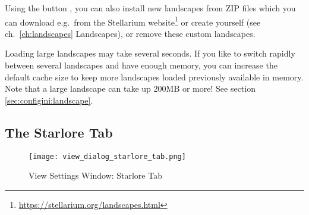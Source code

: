 \noindent Using the button , you can also
install new landscapes from ZIP files which you can download e.g.\
from the Stellarium
website\footnote{\url{https://stellarium.org/landscapes.html}}
or create yourself (see ch.~\ref{ch:landscapes} Landscapes), or remove
these custom landscapes.

Loading large landscapes may take several seconds. 
If you like to switch rapidly between several landscapes and have enough memory, 
you can increase the default cache size to keep more landscapes loaded previously 
available in memory. Note that a large landscape can take up 200MB or more! 
See section \ref{sec:configini:landscape}.

\subsection{The Starlore Tab}
\label{sec:gui:view:starlore}

\begin{figure}[htbp]
\centering\texttt{[image: view\_dialog\_starlore\_tab.png]}
\caption{View Settings Window: Starlore Tab}
\label{fig:gui:view:starlore}
\end{figure}

